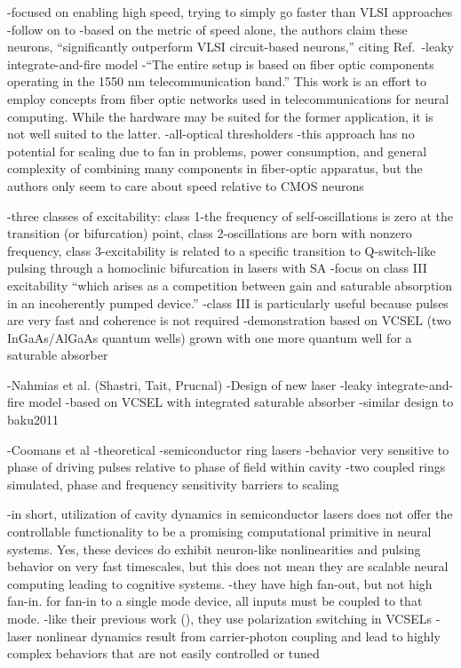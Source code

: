 \cite{krro2011}
-focused on enabling high speed, trying to simply go faster than VLSI approaches
-follow on to \cite{rokr2009}
-based on the metric of speed alone, the authors claim these neurons, ``significantly outperform VLSI circuit-based neurons,'' citing Ref.\,
-leaky integrate-and-fire model
-``The entire setup is based on fiber optic components operating in the 1550 nm telecommunication band.'' This work is an effort to employ concepts from fiber optic networks used in telecommunications for neural computing. While the hardware may be suited for the former application, it is not well suited to the latter.
-all-optical thresholders
-this approach has no potential for scaling due to fan in problems, power consumption, and general complexity of combining many components in fiber-optic apparatus, but the authors only seem to care about speed relative to CMOS neurons

\cite{baku2011}
-three classes of excitability: class 1-the frequency of self-oscillations is zero at the transition (or bifurcation) point, class 2-oscillations are born with nonzero frequency, class 3-excitability is related to a specific transition to Q-switch-like pulsing through a homoclinic bifurcation in lasers with SA
-focus on class III excitability ``which arises as a competition between gain and saturable absorption in an incoherently pumped device.'' 
-class III is particularly useful because pulses are very fast and coherence is not required
-demonstration based on VCSEL (two InGaAs/AlGaAs quantum wells) grown with one more quantum well for a saturable absorber

\cite{nash2013}
-Nahmias et al. (Shastri, Tait, Prucnal)
-Design of new laser
-leaky integrate-and-fire model
-based on VCSEL with integrated saturable absorber
-similar design to baku2011

\cite{coge2011}
-Coomans et al
-theoretical
-semiconductor ring lasers
-behavior very sensitive to phase of driving pulses relative to phase of field within cavity
-two coupled rings simulated, phase and frequency sensitivity barriers to scaling

\cite{husc2012}
-in short, utilization of cavity dynamics in semiconductor lasers does not offer the controllable functionality to be a promising computational primitive in neural systems. Yes, these devices do exhibit neuron-like nonlinearities and pulsing behavior on very fast timescales, but this does not mean they are scalable neural computing leading to cognitive systems.
-they have high fan-out, but not high fan-in. for fan-in to a single mode device, all inputs must be coupled to that mode. 
-like their previous work (\cite{huhe2010}), they use polarization switching in VCSELs
-laser nonlinear dynamics result from carrier-photon coupling and lead to highly complex behaviors that are not easily controlled or tuned

